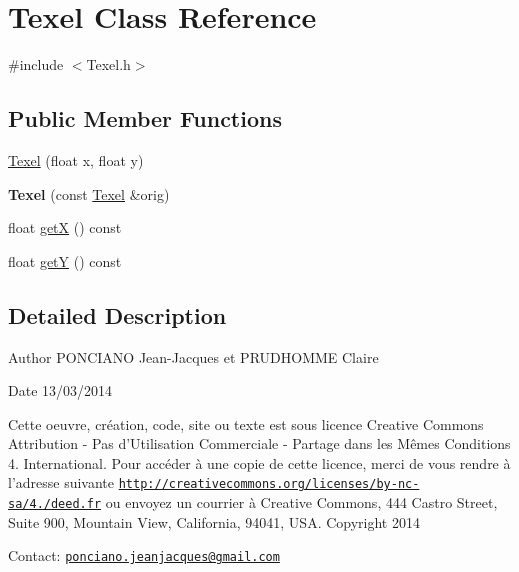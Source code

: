 \hypertarget{classTexel}{\section{Texel Class Reference}
\label{classTexel}
}


{\ttfamily \#include $<$Texel.\-h$>$}

\subsection*{Public Member Functions}
\begin{DoxyCompactItemize}
\item 
\hyperlink{classTexel_a8a37c2a61843dd89f0bdde6a8bd37b2c}{Texel} (float x, float y)
\item 
\hypertarget{classTexel_af7f7003572f03860ed85a04abe40e121}{{\bfseries Texel} (const \hyperlink{classTexel}{Texel} \&orig)}\label{classTexel_af7f7003572f03860ed85a04abe40e121}

\item 
float \hyperlink{classTexel_acca976a45b9f06abb496ec35372c6bb8}{get\-X} () const 
\item 
float \hyperlink{classTexel_a9f1c987201a79e0b3ba70e0d0805b7fd}{get\-Y} () const 
\end{DoxyCompactItemize}


\subsection{Detailed Description}
\begin{DoxyAuthor}{Author}
P\-O\-N\-C\-I\-A\-N\-O Jean-\/\-Jacques et P\-R\-U\-D\-H\-O\-M\-M\-E Claire 
\end{DoxyAuthor}
\begin{DoxyDate}{Date}
13/03/2014
\end{DoxyDate}
Cette oeuvre, création, code, site ou texte est sous licence Creative Commons Attribution -\/ Pas d’\-Utilisation Commerciale -\/ Partage dans les Mêmes Conditions 4. International. Pour accéder à une copie de cette licence, merci de vous rendre à l'adresse suivante \href{http://creativecommons.org/licenses/by-nc-sa/4.0/deed.fr}{\tt http\-://creativecommons.\-org/licenses/by-\/nc-\/sa/4./deed.\-fr} ou envoyez un courrier à Creative Commons, 444 Castro Street, Suite 900, Mountain View, California, 94041, U\-S\-A. Copyright 2014

Contact\-: \href{mailto:ponciano.jeanjacques@gmail.com}{\tt ponciano.\-jeanjacques@gmail.\-com} 

